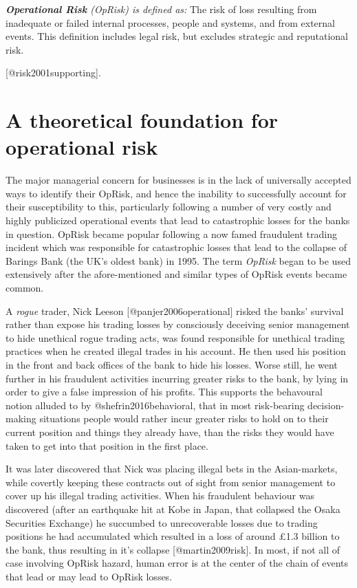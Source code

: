 \documentclass[]{article}
\begin{document}
\begin{definition}
\emph{\textbf{Operational Risk} (OpRisk) is defined as:} The risk of loss resulting from inadequate or failed internal processes, people and systems, and from external events. This definition includes legal risk, but excludes strategic and reputational risk.\medskip
\end{definition}

{[}@risk2001supporting{]}.

\section{A theoretical foundation for operational risk}
\label{sec:A theoretical foundation for operational risk}

The major managerial concern for businesses is in the lack of
universally accepted ways to identify their OpRisk, and hence the
inability to successfully account for their susceptibility to this,
particularly following a number of very costly and highly publicized
operational events that lead to catastrophic losses for the banks in
question. OpRisk became popular following a now famed fraudulent trading
incident which was responsible for catastrophic losses that lead to the
collapse of Barings Bank (the UK's oldest bank) in 1995. The term
\emph{OpRisk} began to be used extensively after the afore-mentioned and
similar types of OpRisk events became common.\medskip

A \emph{rogue} trader, Nick Leeson {[}@panjer2006operational{]} risked
the banks' survival rather than expose his trading losses by consciously
deceiving senior management to hide unethical rogue trading acts, was
found responsible for unethical trading practices when he created
illegal trades in his account. He then used his position in the front
and back offices of the bank to hide his losses. Worse still, he went
further in his fraudulent activities incurring greater risks to the
bank, by lying in order to give a false impression of his profits. This
supports the behavoural notion alluded to by @shefrin2016behavioral,
that in most risk-bearing decision-making situations people would rather
incur greater risks to hold on to their current position and things they
already have, than the risks they would have taken to get into that
position in the first place.\medskip

It was later discovered that Nick was placing illegal bets in the
Asian-markets, while covertly keeping these contracts out of sight from
senior management to cover up his illegal trading activities. When his
fraudulent behaviour was discovered (after an earthquake hit at Kobe in
Japan, that collapsed the Osaka Securities Exchange) he succumbed to
unrecoverable losses due to trading positions he had accumulated which
resulted in a loss of around \pounds 1.3 billion to the bank, thus
resulting in it's collapse {[}@martin2009risk{]}. In most, if not all of
case involving OpRisk hazard, human error is at the center of the chain
of events that lead or may lead to OpRisk losses.\medskip
\end{document}
